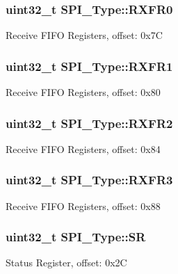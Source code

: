 \subsubsection[{\texorpdfstring{R\+X\+F\+R0}{RXFR0}}]{ uint32\+\_\+t S\+P\+I\+\_\+\+Type\+::\+R\+X\+F\+R0}\hypertarget{structSPI__Type_af53d225f3bd16875b4fcf2f9e6e0cfdc}{}\label{structSPI__Type_af53d225f3bd16875b4fcf2f9e6e0cfdc}
Receive F\+I\+FO Registers, offset\+: 0x7C 
\subsubsection[{\texorpdfstring{R\+X\+F\+R1}{RXFR1}}]{ uint32\+\_\+t S\+P\+I\+\_\+\+Type\+::\+R\+X\+F\+R1}\hypertarget{structSPI__Type_a8c3198672d66f0035b4d22a9ca93d8ed}{}\label{structSPI__Type_a8c3198672d66f0035b4d22a9ca93d8ed}
Receive F\+I\+FO Registers, offset\+: 0x80 
\subsubsection[{\texorpdfstring{R\+X\+F\+R2}{RXFR2}}]{ uint32\+\_\+t S\+P\+I\+\_\+\+Type\+::\+R\+X\+F\+R2}\hypertarget{structSPI__Type_a9f8fcb4decbddd5297058b2c5409a8aa}{}\label{structSPI__Type_a9f8fcb4decbddd5297058b2c5409a8aa}
Receive F\+I\+FO Registers, offset\+: 0x84 
\subsubsection[{\texorpdfstring{R\+X\+F\+R3}{RXFR3}}]{ uint32\+\_\+t S\+P\+I\+\_\+\+Type\+::\+R\+X\+F\+R3}\hypertarget{structSPI__Type_aeb39b56090b9626153ac0501c17ed1cc}{}\label{structSPI__Type_aeb39b56090b9626153ac0501c17ed1cc}
Receive F\+I\+FO Registers, offset\+: 0x88 
\subsubsection[{\texorpdfstring{SR}{SR}}]{ uint32\+\_\+t S\+P\+I\+\_\+\+Type\+::\+SR}\hypertarget{structSPI__Type_ad088a564a1fe1bdbf211c57a2a782139}{}\label{structSPI__Type_ad088a564a1fe1bdbf211c57a2a782139}
Status Register, offset\+: 0x2C 
